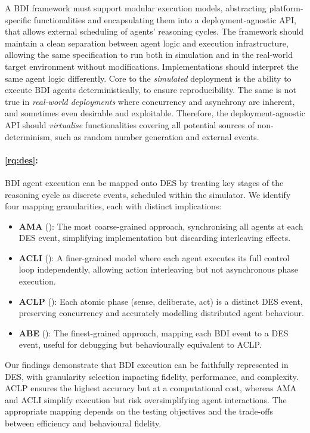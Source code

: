 A \ac{BDI} framework must support modular execution models,
abstracting platform-specific functionalities and encapsulating them into a deployment-agnostic \ac{API},
that allows external scheduling of agents' reasoning cycles.
%
The framework should maintain a clean separation between agent logic and execution infrastructure,
allowing the same specification to run both in simulation and in the real-world target environment
without modifications.
%
Implementations should interpret the same agent logic differently.
%
Core to the \emph{simulated} deployment is
the ability to execute \ac{BDI} agents deterministically,
to ensure reproducibility.
%
The same is not true in \emph{real-world deployments} where concurrency and asynchrony are inherent,
and sometimes even desirable and exploitable.
%
Therefore,
the deployment-agnostic \ac{API} should \emph{virtualise} functionalities covering all potential sources of non-determinism,
such as random number generation and external events.



\paragraph{
    \ref{rq:des}:
}

\ac{BDI} agent execution can be mapped onto \ac{DES} by treating key stages of the reasoning cycle as discrete events,
scheduled within the simulator.
%
We identify four mapping granularities, each with distinct implications:
\begin{itemize}
    \item \textbf{\ac{AMA}} ():
    The most coarse-grained approach, synchronising all agents at each \ac{DES} event,
    simplifying implementation but discarding interleaving effects.
    \item \textbf{\ac{ACLI}} ():
    A finer-grained model where each agent executes its full control loop independently,
    allowing action interleaving but not asynchronous phase execution.
    \item \textbf{\ac{ACLP}} ():
    Each atomic phase (sense, deliberate, act) is a distinct \ac{DES} event,
    preserving concurrency and accurately modelling distributed agent behaviour.
    \item \textbf{\ac{ABE}} ():
    The finest-grained approach, mapping each \ac{BDI} event to a \ac{DES} event,
    useful for debugging but behaviourally equivalent to \ac{ACLP}.
\end{itemize}
%
Our findings demonstrate that \ac{BDI} execution can be faithfully represented in \ac{DES},
with granularity selection impacting fidelity, performance, and complexity.
%
\ac{ACLP} ensures the highest accuracy but at a computational cost,
whereas \ac{AMA} and \ac{ACLI} simplify execution but risk oversimplifying agent interactions.
%
The appropriate mapping depends on the testing objectives and the trade-offs
between efficiency and behavioural fidelity.


